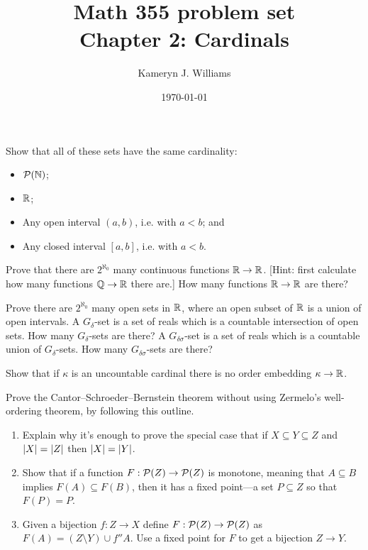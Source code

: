 \documentclass[10pt]{amsart}
\title{Math 355 problem set \\ Chapter 2: Cardinals}
\author{Kameryn J. Williams}
\date{\today}
\begin{document}
\maketitle


\begin{problem}
Show that all of these sets have the same cardinality:
\begin{itemize}
\item $\mathcal{P}(\mathbb{N})$;
\item $\mathbb{R}$;
\item Any open interval $(a,b)$, i.e. with $a < b$; and
\item Any closed interval $[a,b]$, i.e. with $a < b$.
\end{itemize}
\end{problem}

\begin{problem}
Prove that there are $2^{\aleph_0}$ many continuous functions $\mathbb{R} \to \mathbb{R}$. [Hint: first calculate how many functions $\mathbb{Q} \to \mathbb{R}$ there are.] How many functions $\mathbb{R} \to \mathbb{R}$ are there?
\end{problem}

\begin{problem}
Prove there are $2^{\aleph_0}$ many open sets in $\mathbb{R}$, where an open subset of $\mathbb{R}$ is a union of open intervals. A $G_\delta$-set is a set of reals which is a countable intersection of open sets. How many $G_\delta$-sets are there? A $G_{\delta\sigma}$-set is a set of reals which is a countable union of $G_\delta$-sets. How many $G_{\delta\sigma}$-sets are there?
\end{problem}

\begin{problem}
Show that if $\kappa$ is an uncountable cardinal there is no order embedding $\kappa \to \mathbb{R}$.
\end{problem}

\begin{problem}
Prove the Cantor--Schroeder--Bernstein theorem without using Zermelo's well-ordering theorem, by following this outline.
\begin{enumerate}
\item Explain why it's enough to prove the special case that if $X \subseteq Y \subseteq Z$ and $\left\lvert X \right\rvert = \left\lvert Z \right\rvert$ then $\left\lvert X \right\rvert = \left\lvert Y \right\rvert$.
\item Show that if a function $F : \mathcal{P}(Z) \to \mathcal{P}(Z)$ is monotone, meaning that $A \subseteq B$ implies $F(A) \subseteq F(B)$, then it has a fixed point---a set $P \subseteq Z$ so that $F(P) = P$.
\item Given a bijection $f : Z \to X$ define $F : \mathcal{P}(Z) \to \mathcal{P}(Z)$ as $F(A) = (Z \setminus Y) \cup f''A$. Use a fixed point for $F$ to get a bijection $Z \to Y$.
\end{enumerate}
\end{problem}
\end{document}
